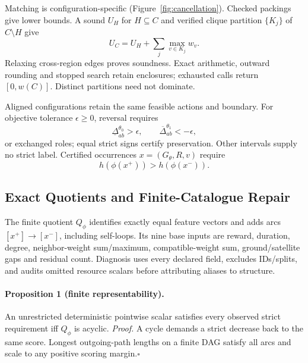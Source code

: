 Matching is configuration-specific (Figure~\ref{fig:cancellation}).
Checked packings give lower bounds.
A sound $U_H$ for $H\subseteq C$ and verified clique partition
$\{K_j\}$ of $C\setminus H$ give
\begin{equation}
 U_C=U_H+\sum_j\max_{v\in K_j}w_v.
 \label{eq:clique-envelope}
\end{equation}
Relaxing cross-region edges proves soundness. Exact arithmetic, outward
rounding and stopped search retain enclosures;
exhausted calls return $[0,w(C)]$. Distinct partitions need not dominate.

Aligned configurations retain the same feasible actions and boundary.
For objective tolerance $\epsilon\geq0$, reversal requires
\begin{equation}
 \underline\Delta^{\theta_0}_{ab}>\epsilon,
 \qquad \overline\Delta^{\theta_1}_{ab}<-\epsilon,
 \label{eq:reversal-certificate}
\end{equation}
or exchanged roles; equal strict signs certify preservation. Other
intervals supply no strict label. Certified occurrences $x=(G_\theta,R,v)$ require
\begin{equation}
 h(\phi(x^+))>h(\phi(x^-)).
 \label{eq:strict-requirement}
\end{equation}

\subsection{Exact Quotients and Finite-Catalogue Repair}
\label{sec:method:repair}
The finite quotient $Q_\phi$ identifies exactly equal feature vectors and
adds arcs $[x^+]\to[x^-]$, including self-loops. Its nine base inputs are
reward, duration, degree, neighbor-weight sum/maximum, compatible-weight
sum, ground/satellite gaps and residual count. Diagnosis uses every declared field,
excludes IDs/splits, and audits omitted resource scalars before attributing
aliases to structure.

\paragraph{Proposition 1 (finite representability).}
An unrestricted deterministic pointwise scalar satisfies every observed
strict requirement iff $Q_\phi$ is acyclic.
\emph{Proof.} A cycle demands a strict decrease back to the same score.
Longest outgoing-path lengths on a finite DAG satisfy all arcs and scale
to any positive scoring margin.\hfill$\square$

